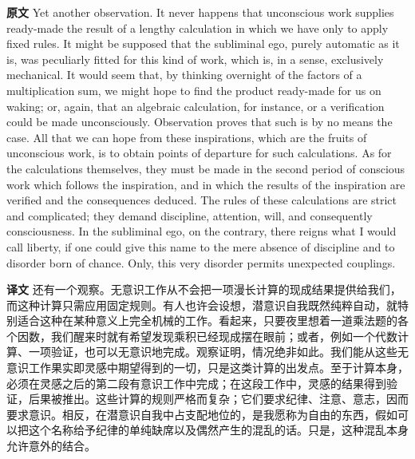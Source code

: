\documentclass[UTF8]{ctexart}
\newenvironment{english}{\par\small\noindent\textbf{原文}\quad\ignorespaces}{\par}
\newenvironment{zhtranslation}{\par\noindent\textbf{译文}\quad\ignorespaces}{\par\vspace{0.35em}}
\begin{document}
\begin{english}
Yet another observation. It never happens that unconscious work supplies ready-made the result of a lengthy calculation in which we have only to apply fixed rules. It might be supposed that the subliminal ego, purely automatic as it is, was peculiarly fitted for this kind of work, which is, in a sense, exclusively mechanical. It would seem that, by thinking overnight of the factors of a multiplication sum, we might hope to find the product ready-made for us on waking; or, again, that an algebraic calculation, for instance, or a verification could be made unconsciously. Observation proves that such is by no means the case. All that we can hope from these inspirations, which are the fruits of unconscious work, is to obtain points of departure for such calculations. As for the calculations themselves, they must be made in the second period of conscious work which follows the inspiration, and in which the results of the inspiration are verified and the consequences deduced. The rules of these calculations are strict and complicated; they demand discipline, attention, will, and consequently consciousness. In the subliminal ego, on the contrary, there reigns what I would call liberty, if one could give this name to the mere absence of discipline and to disorder born of chance. Only, this very disorder permits unexpected couplings.
\end{english}
\begin{zhtranslation}
还有一个观察。无意识工作从不会把一项漫长计算的现成结果提供给我们，而这种计算只需应用固定规则。有人也许会设想，潜意识自我既然纯粹自动，就特别适合这种在某种意义上完全机械的工作。看起来，只要夜里想着一道乘法题的各个因数，我们醒来时就有希望发现乘积已经现成摆在眼前；或者，例如一个代数计算、一项验证，也可以无意识地完成。观察证明，情况绝非如此。我们能从这些无意识工作果实即灵感中期望得到的一切，只是这类计算的出发点。至于计算本身，必须在灵感之后的第二段有意识工作中完成；在这段工作中，灵感的结果得到验证，后果被推出。这些计算的规则严格而复杂；它们要求纪律、注意、意志，因而要求意识。相反，在潜意识自我中占支配地位的，是我愿称为自由的东西，假如可以把这个名称给予纪律的单纯缺席以及偶然产生的混乱的话。只是，这种混乱本身允许意外的结合。\end{zhtranslation}
\end{document}
